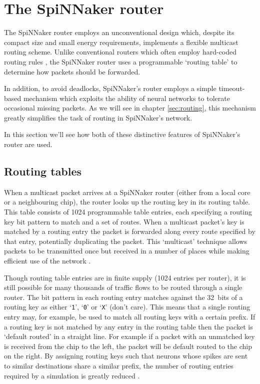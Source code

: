 	\section{The SpiNNaker router}
		
		The SpiNNaker router employs an unconventional design which, despite its
		compact size and small energy requirements, implements a flexible multicast
		routing scheme. Unlike conventional routers which often employ hard-coded
		routing rules \cite{dally04}, the SpiNNaker router uses a programmable
		`routing table' to determine how packets should be forwarded.
		
		In addition, to avoid deadlocks, SpiNNaker's router employs a simple
		timeout-based mechanism which exploits the ability of neural networks to
		tolerate occasional missing packets. As we will see in chapter
		\ref{sec:routing}, this mechanism greatly simplifies the task
		of routing in SpiNNaker's network.
		
		In this section we'll see how both of these distinctive features of
		SpiNNaker's router are used.
		
		\subsection{Routing tables}
		
			When a multicast packet arrives at a SpiNNaker router (either from a
			local core or a neighbouring chip), the router looks up the routing key
			in its routing table. This table consists of \num{1024} programmable
			table entries, each specifying a routing key bit pattern to match and a
			set of routes.  When a multicast packet's key is matched by a routing
			entry the packet is forwarded along every route specified by that entry,
			potentially duplicating the packet. This `multicast' technique allows
			packets to be transmitted once but received in a number of places while
			making efficient use of the network \cite{navaridas12}.
			
			Though routing table entries are in finite supply (\num{1024} entries per
			router), it is still possible for many thousands of traffic flows to be
			routed through a single router. The bit pattern in each routing entry
			matches against the 32~bits of a routing key as either `\texttt{1}',
			`\texttt{0}' or `\texttt{X}' (don't care).  This means that a single
			routing entry may, for example, be used to match all routing keys with a
			certain prefix. If a routing key is not matched by any entry in the
			routing table then the packet is `default routed' in a straight line. For
			example if a packet with an unmatched key is received from the chip to
			the left, the packet will be default routed to the chip on the right. By
			assigning routing keys such that neurons whose spikes are sent to similar
			destinations share a similar prefix, the number of routing entries
			required by a simulation is greatly reduced \cite{davies12}.
			
